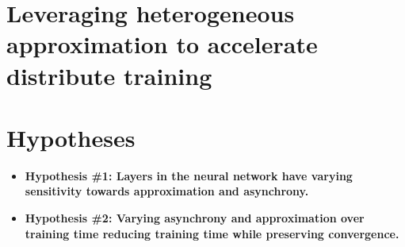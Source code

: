 \section{Leveraging heterogeneous approximation to accelerate distribute training}
\section{Hypotheses}
\begin{itemize}
\item \textbf{Hypothesis \#1: Layers in the neural network have varying sensitivity towards approximation and asynchrony.}
\item \textbf{Hypothesis \#2: Varying asynchrony and approximation over training time reducing training time while preserving convergence.}
\end{itemize}
